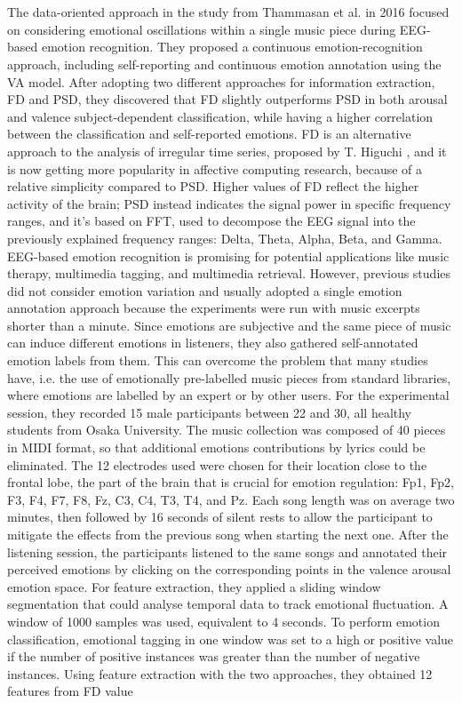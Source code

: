 \\
\\
The data-oriented approach in the study from Thammasan et al.  \cite{thammasan_continuous_2016}  in 2016 focused on considering emotional oscillations within a single music piece during EEG-based emotion recognition. They proposed a continuous emotion-recognition approach, including self-reporting and continuous emotion annotation using the VA model. After adopting two different approaches for information extraction, \ac{FD} and \ac{PSD}, they discovered that \ac{FD} slightly outperforms \ac{PSD} in both arousal and valence subject-dependent classification, while having a higher correlation between the classification and self-reported emotions. \ac{FD} is an alternative approach to the analysis of irregular time series, proposed by T. Higuchi \cite{higuchi_approach_1988}, and it is now getting more popularity in affective computing research, because of a relative simplicity compared to \ac{PSD}. Higher values of FD reflect the higher activity of the brain; \ac{PSD} instead indicates the signal power in specific frequency ranges, and it’s based on \ac{FFT}, used to decompose the EEG signal into the previously explained frequency ranges: Delta, Theta, Alpha, Beta, and Gamma. EEG-based emotion recognition is promising for potential applications like music therapy, multimedia tagging, and multimedia retrieval. However, previous studies did not consider emotion variation and usually adopted a single emotion annotation approach because the experiments were run with music excerpts shorter than a minute. Since emotions are subjective and the same piece of music can induce different emotions in listeners, they also gathered self-annotated emotion labels from them. This can overcome the problem that many studies have, i.e. the use of emotionally pre-labelled music pieces from standard libraries, where emotions are labelled by an expert or by other users. For the experimental session, they recorded 15 male participants between 22 and 30, all healthy students from Osaka University. The music collection was composed of 40 pieces in MIDI format, so that additional emotions contributions by lyrics could be eliminated. The 12 electrodes used were chosen for their location close to the frontal lobe, the part of the brain that is crucial for emotion regulation: Fp1, Fp2, F3, F4, F7, F8, Fz, C3, C4, T3, T4, and Pz. Each song length was on average two minutes, then followed by 16 seconds of silent rests to allow the participant to mitigate the effects from the previous song when starting the next one. After the listening session, the participants listened to the same songs and annotated their perceived emotions by clicking on the corresponding points in the valence arousal emotion space. For feature extraction, they applied a sliding window segmentation that could analyse temporal data to track emotional fluctuation. A window of 1000 samples was used, equivalent to 4 seconds. To perform emotion classification, emotional tagging in one window was set to a high or positive value if the number of positive instances was greater than the number of negative instances. Using feature extraction with the two approaches, they obtained 12 features from \ac{FD} value 